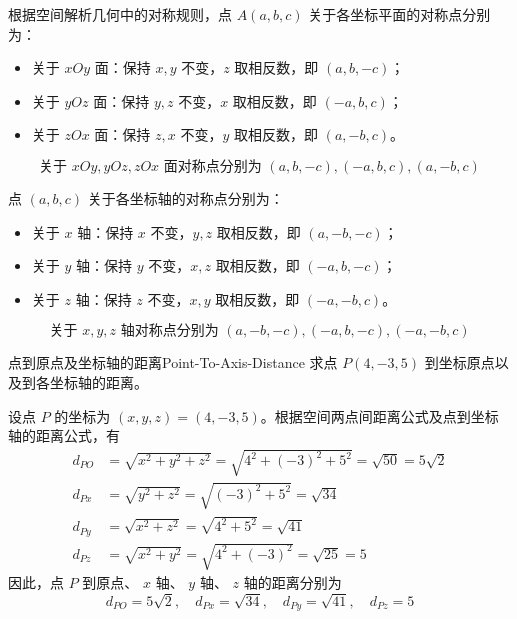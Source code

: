 \begin{solution}
    根据空间解析几何中的对称规则，点 $A(a, b, c)$ 关于各坐标平面的对称点分别为：
    \begin{itemize}
        \item 关于 $xOy$ 面：保持 $x, y$ 不变，$z$ 取相反数，即 $(a, b, -c)$；
        \item 关于 $yOz$ 面：保持 $y, z$ 不变，$x$ 取相反数，即 $(-a, b, c)$；
        \item 关于 $zOx$ 面：保持 $z, x$ 不变，$y$ 取相反数，即 $(a, -b, c)$。
    \end{itemize}
    \begin{equation}
        \boxed{\text{关于 } xOy, yOz, zOx \text{ 面对称点分别为 } (a, b, -c), (-a, b, c), (a, -b, c)}
    \end{equation}

    点 $(a, b, c)$ 关于各坐标轴的对称点分别为：
    \begin{itemize}
        \item 关于 $x$ 轴：保持 $x$ 不变，$y, z$ 取相反数，即 $(a, -b, -c)$；
        \item 关于 $y$ 轴：保持 $y$ 不变，$x, z$ 取相反数，即 $(-a, b, -c)$；
        \item 关于 $z$ 轴：保持 $z$ 不变，$x, y$ 取相反数，即 $(-a, -b, c)$。
    \end{itemize}
    \begin{equation}
        \boxed{\text{关于 } x, y, z \text{ 轴对称点分别为 } (a, -b, -c), (-a, b, -c), (-a, -b, c)}
    \end{equation}
\end{solution}


\begin{problem}{点到原点及坐标轴的距离}{Point-To-Axis-Distance}
    求点 $P(4, -3, 5)$ 到坐标原点以及到各坐标轴的距离。
\end{problem}

\begin{solution}
    设点 $P$ 的坐标为 $(x, y, z) = (4, -3, 5)$。根据空间两点间距离公式及点到坐标轴的距离公式，有
    \begin{equation}
        \begin{aligned}
            d_{PO} & = \sqrt{x^2 + y^2 + z^2} = \sqrt{4^2 + (-3)^2 + 5^2} = \sqrt{50} = 5\sqrt{2} \\
            d_{Px} & = \sqrt{y^2 + z^2} = \sqrt{(-3)^2 + 5^2} = \sqrt{34}                         \\
            d_{Py} & = \sqrt{x^2 + z^2} = \sqrt{4^2 + 5^2} = \sqrt{41}                            \\
            d_{Pz} & = \sqrt{x^2 + y^2} = \sqrt{4^2 + (-3)^2} = \sqrt{25} = 5
        \end{aligned}
    \end{equation}
    因此，点 $P$ 到原点、 $x$ 轴、 $y$ 轴、 $z$ 轴的距离分别为
    \begin{equation}
        \boxed{d_{PO} = 5\sqrt{2}, \quad d_{Px} = \sqrt{34}, \quad d_{Py} = \sqrt{41}, \quad d_{Pz} = 5}
    \end{equation}
\end{solution}

